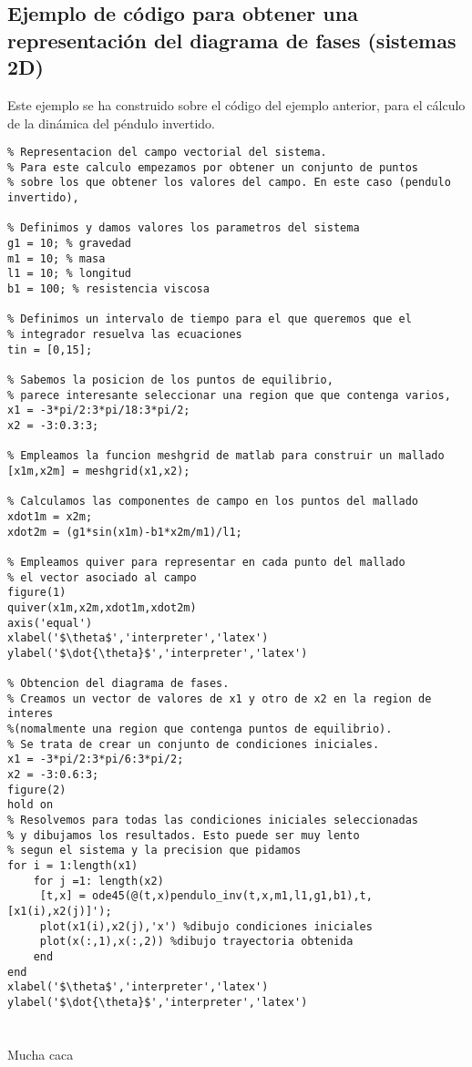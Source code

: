\section[diagramas de fase para sistemas 2D]{Ejemplo de código para obtener una representación del diagrama de fases (sistemas 2D)}

Este ejemplo se ha construido sobre el código del ejemplo anterior, para el cálculo de la dinámica del péndulo invertido.

\begin{lstlisting}
% Representacion del campo vectorial del sistema. 
% Para este calculo empezamos por obtener un conjunto de puntos
% sobre los que obtener los valores del campo. En este caso (pendulo invertido), 

% Definimos y damos valores los parametros del sistema
g1 = 10; % gravedad
m1 = 10; % masa
l1 = 10; % longitud
b1 = 100; % resistencia viscosa

% Definimos un intervalo de tiempo para el que queremos que el
% integrador resuelva las ecuaciones
tin = [0,15];

% Sabemos la posicion de los puntos de equilibrio, 
% parece interesante seleccionar una region que que contenga varios,
x1 = -3*pi/2:3*pi/18:3*pi/2;
x2 = -3:0.3:3;

% Empleamos la funcion meshgrid de matlab para construir un mallado
[x1m,x2m] = meshgrid(x1,x2);

% Calculamos las componentes de campo en los puntos del mallado
xdot1m = x2m; 
xdot2m = (g1*sin(x1m)-b1*x2m/m1)/l1;

% Empleamos quiver para representar en cada punto del mallado
% el vector asociado al campo 
figure(1)
quiver(x1m,x2m,xdot1m,xdot2m)
axis('equal')
xlabel('$\theta$','interpreter','latex')
ylabel('$\dot{\theta}$','interpreter','latex')

% Obtencion del diagrama de fases.
% Creamos un vector de valores de x1 y otro de x2 en la region de interes
%(nomalmente una region que contenga puntos de equilibrio).
% Se trata de crear un conjunto de condiciones iniciales.
x1 = -3*pi/2:3*pi/6:3*pi/2;
x2 = -3:0.6:3;
figure(2)
hold on
% Resolvemos para todas las condiciones iniciales seleccionadas
% y dibujamos los resultados. Esto puede ser muy lento
% segun el sistema y la precision que pidamos
for i = 1:length(x1)
    for j =1: length(x2)
     [t,x] = ode45(@(t,x)pendulo_inv(t,x,m1,l1,g1,b1),t,[x1(i),x2(j)]');
     plot(x1(i),x2(j),'x') %dibujo condiciones iniciales
     plot(x(:,1),x(:,2)) %dibujo trayectoria obtenida 
    end
end
xlabel('$\theta$','interpreter','latex')
ylabel('$\dot{\theta}$','interpreter','latex')

\end{lstlisting}
\chapter{}
Mucha caca